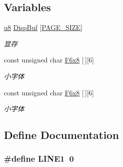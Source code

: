 \subsection*{\-Variables}
\begin{DoxyCompactItemize}
\item 
\hypertarget{group___o_l_e_d_ga69ba5856b5e9fee929f603131fe72d20}{\hyperlink{group___b_s_p_gaed742c436da53c1080638ce6ef7d13de}{u8} \hyperlink{group___o_l_e_d_ga69ba5856b5e9fee929f603131fe72d20}{\-Disp\-Buf} \mbox{[}\hyperlink{group___o_l_e_d_ga7d467c1d283fdfa1f2081ba1e0d01b6e}{\-P\-A\-G\-E\-\_\-\-S\-I\-Z\-E}\mbox{]}}\label{group___o_l_e_d_ga69ba5856b5e9fee929f603131fe72d20}

\begin{DoxyCompactList}\small\item\em 显存 \end{DoxyCompactList}\item 
\hypertarget{group___o_l_e_d_ga85c187875dc35639a25aad90bdb6fd06}{const unsigned char \hyperlink{group___o_l_e_d_ga85c187875dc35639a25aad90bdb6fd06}{\-F6x8} \mbox{[}$\,$\mbox{]}\mbox{[}6\mbox{]}}\label{group___o_l_e_d_ga85c187875dc35639a25aad90bdb6fd06}

\begin{DoxyCompactList}\small\item\em 小字体 \end{DoxyCompactList}\item 
\hypertarget{group___o_l_e_d_ga85c187875dc35639a25aad90bdb6fd06}{const unsigned char \hyperlink{group___o_l_e_d_ga85c187875dc35639a25aad90bdb6fd06}{\-F6x8} \mbox{[}$\,$\mbox{]}\mbox{[}6\mbox{]}}\label{group___o_l_e_d_ga85c187875dc35639a25aad90bdb6fd06}

\begin{DoxyCompactList}\small\item\em 小字体 \end{DoxyCompactList}\end{DoxyCompactItemize}


\subsection{\-Define \-Documentation}
\hypertarget{group___o_l_e_d_ga4c0102b3d63c7bd2d59a424ca3815ad1}{
\subsubsection[{\-L\-I\-N\-E1}]{\setlength{\rightskip}{0pt plus 5cm}\#define {\bf \-L\-I\-N\-E1}~0}}\label{group___o_l_e_d_ga4c0102b3d63c7bd2d59a424ca3815ad1}



